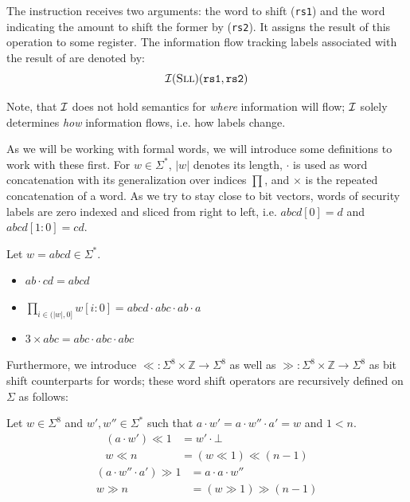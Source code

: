 \begin{example}
    The  instruction receives two arguments: the word to shift (\texttt{rs1}) and the word indicating the amount to shift the former by (\texttt{rs2}).
    It assigns the result of this operation to some register.
    The information flow tracking labels associated with the result of  are denoted by:
    \begin{equation*}
        \mathcal{I}(\textsc{Sll})(\texttt{rs1}, \texttt{rs2})
    \end{equation*}

    Note, that $ \mathcal{I} $ does not hold semantics for \textit{where} information will flow; $ \mathcal{I} $ solely determines \textit{how} information flows, i.e. how labels change.
\end{example}

As we will be working with formal words, we will introduce some definitions to work with these first.
For $ w  \in \Sigma^* $, $ |w| $ denotes its length,
$ \cdot $ is used as word concatenation with its generalization over indices $ \prod $, and $ \times $ is the repeated concatenation of a word.
As we try to stay close to bit vectors, words of security labels are zero indexed and sliced from right to left, i.e. $ abcd[0] = d $ and $ abcd[1:0] = cd $.

\begin{example}
    Let $ w = abcd \in \Sigma^* $.
    \begin{itemize}
        \item $ ab \cdot cd = abcd $
        \item $ \prod_{i \in (|w|, 0]} w[i:0] = abcd \cdot abc \cdot ab \cdot a $
        \item $ 3 \times abc = abc \cdot abc \cdot abc $
    \end{itemize}
\end{example}

Furthermore, we introduce $ \ll : \Sigma^8 \times \mathbb{Z} \rightarrow \Sigma^8 $ as well as $ \gg : \Sigma^8 \times \mathbb{Z} \rightarrow \Sigma^8 $ as bit shift counterparts for words; these word shift operators are recursively defined on $ \Sigma $ as follows:

Let $ w \in \Sigma^8 $ and $ w', w'' \in \Sigma^* $ such that $ a \cdot w' = a \cdot w'' \cdot a' = w $ and $ 1 < n $.
\begin{align*}
    (a \cdot w') \ll 1 &= w' \cdot \bot \\
    w \ll n &= (w \ll 1) \ll (n - 1)
\end{align*}
\begin{align*}
    (a \cdot w'' \cdot a') \gg 1 &= a \cdot a \cdot w'' \\
    w \gg n &= (w \gg 1) \gg (n - 1)
\end{align*}

